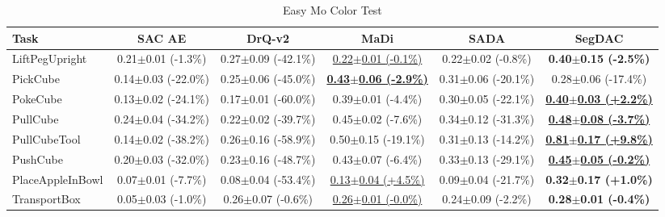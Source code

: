 \begin{table}[htbp]
\centering
\scriptsize
\caption{Easy Mo Color Test}
\label{tab:appendix_mocolortest_easy}
\begin{adjustbox}{max width=\textwidth}
\begin{tabular}{l*{5}{c}}
\toprule
\textbf{Task} & \textbf{SAC AE} & \textbf{DrQ-v2} & \textbf{MaDi} & \textbf{SADA} & \textbf{SegDAC} \\
\midrule
LiftPegUpright & 0.21$\pm$0.01 \scriptsize{(-1.3\%)} & 0.27$\pm$0.09 \scriptsize{(-42.1\%)} & \underline{0.22$\pm$0.01 \scriptsize{(-0.1\%)}} & 0.22$\pm$0.02 \scriptsize{(-0.8\%)} & \textbf{0.40$\pm$0.15 \scriptsize{(-2.5\%)}} \\
PickCube & 0.14$\pm$0.03 \scriptsize{(-22.0\%)} & 0.25$\pm$0.06 \scriptsize{(-45.0\%)} & \textbf{\underline{0.43$\pm$0.06 \scriptsize{(-2.9\%)}}} & 0.31$\pm$0.06 \scriptsize{(-20.1\%)} & 0.28$\pm$0.06 \scriptsize{(-17.4\%)} \\
PokeCube & 0.13$\pm$0.02 \scriptsize{(-24.1\%)} & 0.17$\pm$0.01 \scriptsize{(-60.0\%)} & 0.39$\pm$0.01 \scriptsize{(-4.4\%)} & 0.30$\pm$0.05 \scriptsize{(-22.1\%)} & \textbf{\underline{0.40$\pm$0.03 \scriptsize{(+2.2\%)}}} \\
PullCube & 0.24$\pm$0.04 \scriptsize{(-34.2\%)} & 0.22$\pm$0.02 \scriptsize{(-39.7\%)} & 0.45$\pm$0.02 \scriptsize{(-7.6\%)} & 0.34$\pm$0.12 \scriptsize{(-31.3\%)} & \textbf{\underline{0.48$\pm$0.08 \scriptsize{(-3.7\%)}}} \\
PullCubeTool & 0.14$\pm$0.02 \scriptsize{(-38.2\%)} & 0.26$\pm$0.16 \scriptsize{(-58.9\%)} & 0.50$\pm$0.15 \scriptsize{(-19.1\%)} & 0.31$\pm$0.13 \scriptsize{(-14.2\%)} & \textbf{\underline{0.81$\pm$0.17 \scriptsize{(+9.8\%)}}} \\
PushCube & 0.20$\pm$0.03 \scriptsize{(-32.0\%)} & 0.23$\pm$0.16 \scriptsize{(-48.7\%)} & 0.43$\pm$0.07 \scriptsize{(-6.4\%)} & 0.33$\pm$0.13 \scriptsize{(-29.1\%)} & \textbf{\underline{0.45$\pm$0.05 \scriptsize{(-0.2\%)}}} \\
PlaceAppleInBowl & 0.07$\pm$0.01 \scriptsize{(-7.7\%)} & 0.08$\pm$0.04 \scriptsize{(-53.4\%)} & \underline{0.13$\pm$0.04 \scriptsize{(+4.5\%)}} & 0.09$\pm$0.04 \scriptsize{(-21.7\%)} & \textbf{0.32$\pm$0.17 \scriptsize{(+1.0\%)}} \\
TransportBox & 0.05$\pm$0.03 \scriptsize{(-1.0\%)} & 0.26$\pm$0.07 \scriptsize{(-0.6\%)} & \underline{0.26$\pm$0.01 \scriptsize{(-0.0\%)}} & 0.24$\pm$0.09 \scriptsize{(-2.2\%)} & \textbf{0.28$\pm$0.01 \scriptsize{(-0.4\%)}} \\
\bottomrule
\end{tabular}
\end{adjustbox}
\end{table}

